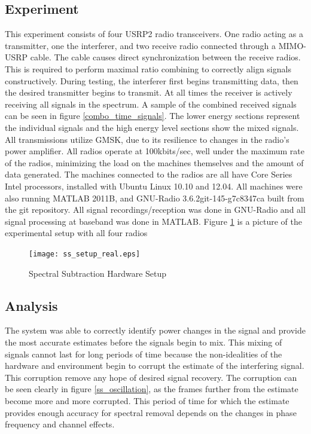 \subsection{Experiment}

This experiment consists of four USRP2 radio transceivers.  One radio acting as a transmitter, one the interferer, and two receive radio connected through a MIMO-USRP cable.  The cable causes direct synchronization between the receive radios.  This is required to perform maximal ratio combining to correctly align signals constructively.  During testing, the interferer first begins transmitting data, then the desired transmitter begins to transmit.  At all times the receiver is actively receiving all signals in the spectrum.  A sample of the combined received signals can be seen in figure \ref{combo_time_signals}.  The lower energy sections represent the individual signals and the high energy level sections show the mixed signals.\\

All transmissions utilize GMSK, due to its resilience to changes in the radio's power amplifier.  All radios operate at 100kbits/sec, well under the maximum rate of the radios, minimizing the load on the machines themselves and the amount of data generated.  The machines connected to the radios are all have Core Series Intel processors, installed with Ubuntu Linux 10.10 and 12.04.  All machines were also running MATLAB 2011B, and GNU-Radio 3.6.2git-145-g7c8347ca built from the git repository.  All signal recordings/reception was done in GNU-Radio and all signal processing at baseband was done in MATLAB.  Figure \ref{ss_setup_real} is a picture of the experimental setup with all four radios

\begin{figure}\label{ss_setup_real}
\centering
\texttt{[image: ss\_setup\_real.eps]}
\caption{Spectral Subtraction Hardware Setup}
\end{figure}

\subsection{Analysis}

The system was able to correctly identify power changes in the signal and provide the most accurate estimates before the signals begin to mix.  This mixing of signals cannot last for long periods of time because the non-idealities of the hardware and environment begin to corrupt the estimate of the interfering signal.  This corruption remove any hope of desired signal recovery.  The corruption can be seen clearly in figure \ref{ss_oscillation}, as the frames further from the estimate become more and more corrupted.  This period of time for which the estimate provides enough accuracy for spectral removal depends on the changes in phase frequency and channel effects.\\


